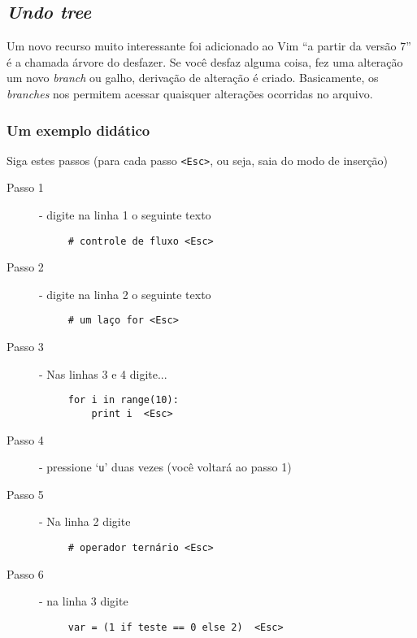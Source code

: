 \subsection{{\em Undo tree}}
\label{Undo tree}

Um novo recurso muito interessante foi adicionado ao Vim ``a partir da
versão 7''  é a chamada árvore do desfazer.  Se
você desfaz alguma coisa, fez uma alteração um novo {\em branch} ou
galho, derivação de alteração é criado.  Basicamente, os {\em branches}
nos permitem acessar quaisquer alterações ocorridas no arquivo.

\subsubsection{Um exemplo didático}
\label{Um exemplo didático}

Siga estes passos (para cada passo \verb|<Esc>|, ou seja, saia do modo
de inserção)

\begin{description}
\item [Passo 1] - digite na linha 1 o seguinte texto
\begin{verbatim}
     # controle de fluxo <Esc>
\end{verbatim}

\item [Passo 2] - digite na linha 2 o seguinte texto
\begin{verbatim}
     # um laço for <Esc>
\end{verbatim}

\item [Passo 3] - Nas linhas 3 e 4 digite...

\begin{verbatim}
     for i in range(10):
         print i  <Esc>
\end{verbatim}

\item [Passo 4] - pressione `{\tt u}' duas vezes (você voltará ao passo 1)
\item [Passo 5] - Na linha 2 digite

\begin{verbatim}
     # operador ternário <Esc>
\end{verbatim}

\item [Passo 6] - na linha 3 digite

\begin{verbatim}
     var = (1 if teste == 0 else 2)  <Esc>
\end{verbatim}

\end{description}

